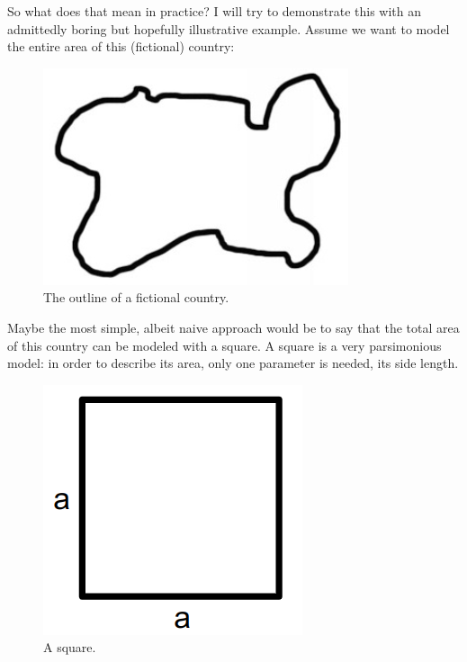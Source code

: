 \documentclass[
  a4paperpaper,
  ,captions=tableheading
]{scrbook}
\begin{document}
So what does that mean in practice? I will try to demonstrate this with
an admittedly boring but hopefully illustrative example. Assume we want
to model the entire area of this (fictional) country:

\begin{figure}

{\centering \includegraphics{img/fictional_country.png}

}

\caption{The outline of a fictional country.}

\end{figure}

Maybe the most simple, albeit naive approach would be to say that the
total area of this country can be modeled with a square. A square is a
very parsimonious model: in order to describe its area, only one
parameter is needed, its side length.

\begin{figure}

{\centering \includegraphics{img/square.png}

}

\caption{A square.}

\end{figure}
\end{document}
